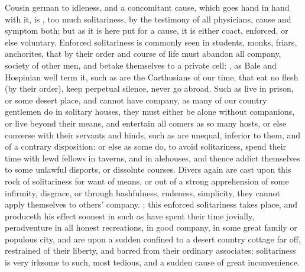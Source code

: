 Cousin german to idleness, and a concomitant cause, which goes hand in hand
with it, is , too much solitariness, by
the testimony of all physicians, cause and symptom both; but as it is here put
for a cause, it is either coact, enforced, or else voluntary. Enforced
solitariness is commonly seen in students, monks, friars, anchorites, that by
their order and course of life must abandon all company, society of other men,
and betake themselves to a private cell: , as
Bale and Hospinian well term it, such as are the Carthusians of our time, that
eat no flesh (by their order), keep perpetual silence, never go abroad. Such as
live in prison, or some desert place, and cannot have company, as many of our
country gentlemen do in solitary houses, they must either be alone without
companions, or live beyond their means, and entertain all comers as so many
hosts, or else converse with their servants and hinds, such as are unequal,
inferior to them, and of a contrary disposition: or else as some do, to avoid
solitariness, spend their time with lewd fellows in taverns, and in alehouses,
and thence addict themselves to some unlawful disports, or dissolute courses.
Divers again are cast upon this rock of solitariness for want of means, or out
of a strong apprehension of some infirmity, disgrace, or through bashfulness,
rudeness, simplicity, they cannot apply themselves to others' company.
; this enforced solitariness takes place, and produceth his effect
soonest in such as have spent their time jovially, peradventure in all honest
recreations, in good company, in some great family or populous city, and are
upon a sudden confined to a desert country cottage far off, restrained of their
liberty, and barred from their ordinary associates; solitariness is very
irksome to such, most tedious, and a sudden cause of great inconvenience.

